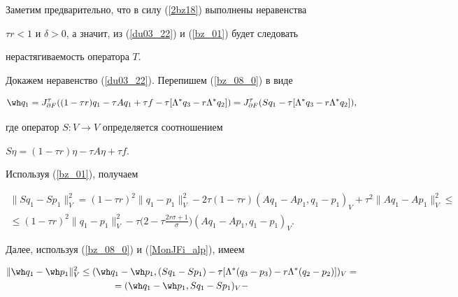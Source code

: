 \begin{pf}


Заметим предварительно, что в силу (\ref{2bz18}) выполнены неравенства 


$\tau r <1 $ и $\delta > 0$, а значит, из (\ref{du03_22}) и (\ref{bz_01}) будет следовать 


нерастягиваемость оператора $T$. 





Докажем неравенство (\ref{du03_22}). Перепишем (\ref{bz_08_0}) в виде


$$


\wh q_1=J_{\partial F}^{\tau} ((1- \tau r) q_1-\tau A q_1 


+\tau f-\tau [ {\Lambda ^* q_3-r \Lambda ^* q_2} ]) =


J_{\partial F}^{\tau} (S q_1-\tau [ {\Lambda ^* q_3-r \Lambda ^* q_2} ]),


$$


где оператор $S: V \to V$ определяется соотношением 


$S \eta=(1- \tau r) \eta-\tau A \eta +\tau f$. 


Используя (\ref{bz_01}), получаем


\begin{multline}


\|S q_1-S p_1 \|_V^2=(1- \tau r)^2 \| q_1-p_1 \|_V^2 -


2 \tau (1- \tau r) (A q_1-A p_1, q_1-p_1)_V+\tau^2 \| {A q_1-A p_1} \|_V^2 \leq \\


%


\leq (1- \tau r)^2 \| {q_1-p_1} \|_V^2 -


\tau \bigg(2-\tau \frac {2 r \sigma+1} {\sigma} \bigg) (A q_1-A p_1, q_1-p_1)_V.


\label{2bz19}


\end{multline}


Далее, используя (\ref{bz_08_0}) и (\ref{MonJFi_alp}), имеем


\begin{multline}


\| {\wh q_1-\wh p_1} \|_V^2 \leq


(\wh q_1-\wh p_1, (S q_1-S p_1)-


\tau [ {\Lambda ^* (q_3-p_3)-r \Lambda ^* (q_2- p_2)} ])_V=\\


%


= (\wh q_1-\wh p_1 , S q_1-S p_1)_V-



\end{multline}
\end{pf}
